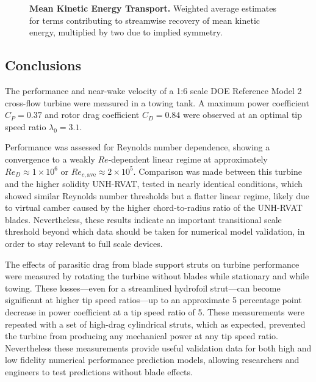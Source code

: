 \documentclass[10pt,letterpaper]{article}
\begin{document}
\begin{figure}

    \caption{{\bf Mean Kinetic Energy Transport.} Weighted average estimates for
    terms contributing to streamwise recovery of mean kinetic energy, multiplied
    by two due to implied symmetry.}

    \label{fig:Ktransport}
\end{figure}


\subsection*{Conclusions}

The performance and near-wake velocity of a 1:6 scale DOE Reference Model 2
cross-flow turbine were measured in a towing tank. A maximum power coefficient
$C_P = 0.37$ and rotor drag coefficient $C_D = 0.84$ were observed at an optimal
tip speed ratio $\lambda_0 = 3.1$.

Performance was assessed for Reynolds number dependence, showing a convergence
to a weakly $Re$-dependent linear regime at approximately $Re_D \approx 1 \times
10^6$ or $Re_{c,\mathrm{ave}} \approx 2 \times 10^5$. Comparison was made
between this turbine and the higher solidity UNH-RVAT, tested in nearly
identical conditions, which showed similar Reynolds number thresholds but a
flatter linear regime, likely due to virtual camber caused by the higher
chord-to-radius ratio of the UNH-RVAT blades. Nevertheless, these results
indicate an important transitional scale threshold beyond which data should be
taken for numerical model validation, in order to stay relevant to full scale
devices.

The effects of parasitic drag from blade support struts on turbine performance
were measured by rotating the turbine without blades while stationary and while
towing. These losses---even for a streamlined hydrofoil strut---can become
significant at higher tip speed ratios---up to an approximate 5 percentage point
decrease in power coefficient at a tip speed ratio of 5. These measurements were
repeated with a set of high-drag cylindrical struts, which as expected,
prevented the turbine from producing any mechanical power at any tip speed
ratio. Nevertheless these measurements provide useful validation data for both
high and low fidelity numerical performance prediction models, allowing
researchers and engineers to test predictions without blade effects.
\end{document}
